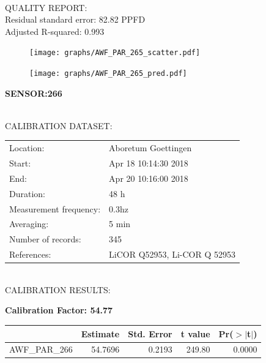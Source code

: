 \documentclass[oneside]{report}
\begin{document}
\hrulefill\\
QUALITY REPORT:\\
Residual standard error: 82.82 PPFD\\
Adjusted R-squared: 0.993



\begin{figure}[H]
  \centering
  \texttt{[image: graphs/AWF\_PAR\_265\_scatter.pdf]}
\end{figure}




\begin{figure}[H]
  \centering
  \texttt{[image: graphs/AWF\_PAR\_265\_pred.pdf]}
\end{figure}

\pagebreak


\begin{center}
\large{\textbf{SENSOR:266}}\\
\end{center}

\hrulefill\\
CALIBRATION DATASET:\\
\begin{table}[h!]
  \centering
  \label{tab:table1}
  \begin{tabular}{ll}
    Location: & Aboretum Goettingen\\ 
    
    
    Start:  & Apr 18 10:14:30 2018 \\
    End:   & Apr 20 10:16:00 2018\\ 
    Duration: & 48 h\\
    Measurement frequency: & 0.3hz\\
    Averaging:  &5 min\\
    Number of records: & 345 \\
    References: & LiCOR Q52953, Li-COR Q 52953 \\
  \end{tabular}
\end{table}

\hrulefill\\
CALIBRATION RESULTS:\\


\begin{center}
\textbf{\large{Calibration Factor: 54.77}}\\
\end{center}
\begin{table}[ht]
\centering
\begin{tabular}{rrrrr}
  \hline
 & Estimate & Std. Error & t value & Pr($>$$|$t$|$) \\ 
  \hline
AWF\_PAR\_266 & 54.7696 & 0.2193 & 249.80 & 0.0000 \\ 
   \hline
\end{tabular}
\end{table}
\end{document}
